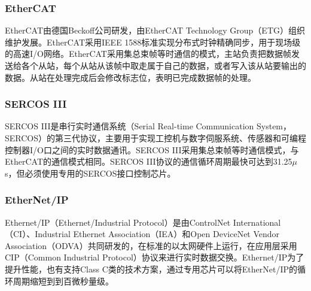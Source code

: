 \subsubsection{EtherCAT}
EtherCAT由德国Beckoff公司研发，由EtherCAT Technology Group（ETG）组织维护发展。EtherCAT采用IEEE 1588标准实现分布式时钟精确同步，用于现场级的高速I/O网络\cite{Wang2011}。EtherCAT采用集总束帧等时通信的模式，主站负责把数据帧发送给各个从站，每个从站从该帧中取走属于自己的数据，或者写入该从站要输出的数据。从站在处理完成后会修改标志位，表明已完成数据帧的处理。

\subsubsection{SERCOS III}
SERCOS III是串行实时通信系统（Serial Real-time Communication System，SERCOS）的第三代协议，主要用于实现工控机与数字伺服系统、传感器和可编程控制器I/O口之间的实时数据通讯\cite{Wang2017}。SERCOS III采用集总束帧等时通信模式，与EtherCAT的通信模式相同。SERCOS III协议的通信循环周期最快可达到31.25$\mu$s，但必须使用专用的SERCOS接口控制芯片。

\subsubsection{EtherNet/IP}
Ethernet/IP（Ethernet/Industrial Protocol）是由ControlNet International（CI）、Industrial Ethernet Association（IEA）和Open DeviceNet Vendor Association（ODVA）共同研发的，在标准的以太网硬件上运行，在应用层采用CIP（Common Industrial Protocol）协议来进行实时数据交换\cite{Paul2001}。Ethernet/IP为了提升性能，也有支持Class C类的技术方案，通过专用芯片可以将EtherNet/IP的循环周期缩短到到百微秒量级。

